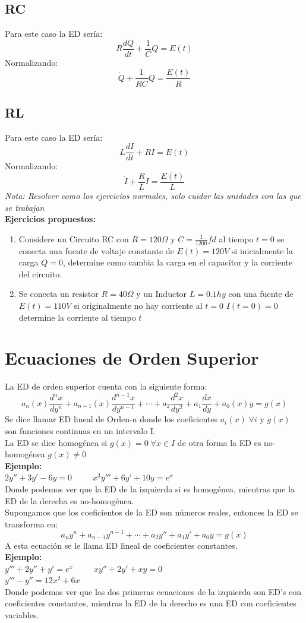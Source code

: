 \documentclass[10pt]{article}
\begin{document}
\subsection{RC}
Para este caso la ED sería:
\[R\frac{dQ}{dt}+\frac{1}{C}Q=E(t)\]
Normalizando:
\[\dot{Q}+\frac{1}{RC}Q=\frac{E(t)}{R}\]
\subsection{RL}
Para este caso la ED sería:
\[L\frac{dI}{dt}+RI=E(t)\]
Normalizando:
\[\dot{I}+\frac{R}{L}I=\frac{E(t)}{L}\]
\textit{Nota: Resolver como los ejercicios normales, solo cuidar las unidades con las que se trabajan}\\
\textbf{Ejercicios propuestos:}
\begin{enumerate}
  \item Considere un Circuito RC con $R=120\Omega$ y \(\displaystyle C=\frac{1}{1200}fd\) al tiempo $t=0$ se conecta una fuente de voltaje constante de $E(t)=120V$ si inicialmente la carga $Q=0$, determine como cambia la carga en el capacitor y la corriente del circuito.
  \item Se conecta un resistor $R=40\Omega$ y un Inductor $L=0.1hy$ con una fuente de $E(t)=110V$ si originalmente no hay corriente al $t=0$ $I(t=0)=0$ determine la corriente al tiempo $t$
\end{enumerate}
\section{Ecuaciones de Orden Superior}
La ED de orden superior cuenta con la siguiente forma:
\[a_{n}(x)\frac{d^{n}x}{dy^{n}}+a_{n-1}(x)\frac{d^{n-1}x}{dy^{n-1}}+\cdots+a_{2}\frac{d^{2}x}{dy^{2}}+a_{1}\frac{dx}{dy}+a_{0}(x)y=g(x)\]
Se dice llamar ED lineal de Orden-n donde los coeficientes $a_{i}(x)\;\forall i$ y $g(x)$ son funciones continuas en un intervalo I.\\
La ED se dice homogénea si $g(x)=0\;\forall x\in I$ de otra forma la ED es no-homogénea $g(x)\neq 0$
\\
\textbf{Ejemplo:}\\
\(\displaystyle 2y''+3y'-6y=0\;\;\;\;\;\;\;\;\;x^{3}y'''+6y'+10y=e^{x}\)\\
Donde podemos ver que la ED de la izquierda si es homogénea, mientras que la ED de la derecha es no-homogénea.\\
Supongamos que los coeficientos de la ED son números reales, entonces la ED se transforma en:
\[a_{n}y^{n}+a_{n-1}y^{n-1}+\cdots+a_{2}y''+a_{1}y'+a_{0}y=g(x)\]
A esta ecuación se le llama ED lineal de coeficientes constantes.\\
\textbf{Ejemplo:}\\
\(\displaystyle y'''+2y''+y'=e^{x}\;\;\;\;\;\;\;\;\;xy''+2y'+xy=0\)\\
\(\displaystyle y'''-y''=12x^{2}+6x\)\\
Donde podemos ver que las dos primeras ecuaciones de la izquierda son ED's con coeficientes constantes, mientras la ED de la derecho es una ED con coeficientes variables.
\clearpage
\end{document}

